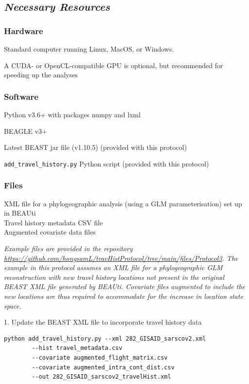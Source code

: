 \documentclass{article}
\newcommand{\ann}[1]{
\begin{adjustwidth}{0.5cm}{}
\it{#1}\\
\end{adjustwidth}}
\begin{document}
\subsection*{\textbf{\textit{Necessary Resources}}}
\subsubsection*{Hardware}
\hspace{0.5cm}Standard computer running Linux, MacOS, or Windows.

\hspace{0.5cm}A CUDA- or OpenCL-compatible GPU is optional, but recommended for speeding up the analyses

\subsubsection*{Software}
\hspace{0.5cm}Python v3.6+ with packages numpy and lxml

\hspace{0.5cm}BEAGLE v3+

\hspace{0.5cm}Latest BEAST jar file (v1.10.5) (provided with this protocol)

\hspace{0.5cm}\verb|add_travel_history.py| Python script (provided with this protocol)

\subsubsection*{Files}
XML file for a phylogeographic analysis (using a GLM  parameterisation) set up in BEAUti \\
Travel history metadata CSV file \\
Augmented covariate data files \\

\ann{Example files are provided in the repository\\
{\upshape\url{https://github.com/hongsamL/travHistProtocol/tree/main/files/Protocol3}}.
The example in this protocol assumes an XML file for a phylogeographic GLM reconstruction with new travel history locations not present in the original BEAST XML file generated by BEAUti.
Covariate files augmented to include the new locations are thus required to accommodate for the increase in location state space.}

1. Update the BEAST XML file to incorporate travel history data
\begin{verbatim}
python add_travel_history.py --xml 282_GISAID_sarscov2.xml
        --hist travel_metadata.csv
        --covariate augmented_flight_matrix.csv
        --covariate augmented_intra_cont_dist.csv
        --out 282_GISAID_sarscov2_travelHist.xml
\end{verbatim}
\end{document}
